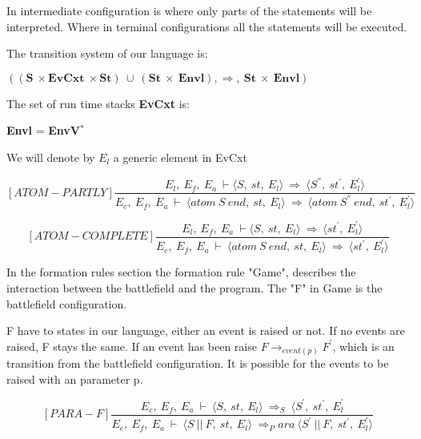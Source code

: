    	In intermediate configuration is where only parts of the statements will be interpreted. Where in terminal configurations  all the statements will be executed.
   	
   	The transition system of our language is:
   	 
   	\begin{math}
   		((\boldsymbol{S} \ \times \boldsymbol{EvCxt} \ \times \boldsymbol{St}) \ \cup \ (\boldsymbol{St} \ \times \ \boldsymbol{Envl}), \Rightarrow, \ \boldsymbol{St} \ \times \ \boldsymbol{Envl})
   	\end{math}
   	
   	The set of run time stacks \textbf{EvCxt} is:
   	
   	\textbf{Envl} = \textbf{EnvV}\begin{math}
   	^*
   	\end{math}
   	
   	We will denote by \begin{math} E_l \end{math} a generic element in EvCxt
   	
   	\[
   	[ATOM-PARTLY]
   	\dfrac{E_l, \ E_f, \ E_a \ \vdash \langle S, \ st, \ E_l \rangle \ \Rightarrow \ \langle S^{''}, \ st^{'}, \ E_l^{'} \rangle}{E_e, \ E_f, \ E_a \ \vdash \ \langle atom \ S \ end, \ st, \ E_l \rangle \ \Rightarrow \ \langle atom \ S^{''} \ end, \ st^{'}, \ E_l^{'} \rangle}
   	\]
   	
   	\[
   	[ATOM-COMPLETE]
   	\dfrac{E_l, \ E_f, \ E_a \ \vdash \langle S, \ st, \ E_l \rangle \ \Rightarrow \ \langle st^{'}, \ E_l^{'} \rangle}{E_e, \ E_f, \ E_a \ \vdash \ \langle atom \ S \ end, \ st, \ E_l \rangle \ \Rightarrow \ \langle st^{'}, \ E_l^{'} \rangle}
   	\]
   	
   	In the formation rules section the formation rule "Game", describes the interaction between the battlefield and the program. The "F" in Game is the battlefield configuration. 
   	
   	F have to states in our language, either an event is raised or not. If no events are raised, F stays the same. If an event has been raise \begin{math} F \rightarrow_{event(p)} F^{'} \end{math}, which is an transition from the battlefield configuration. It is possible for the events to be raised with an parameter p. 
   	
   	\[
   	[PARA-F]
   	\dfrac{E_e, \ E_f, \ E_a \ \vdash \ \langle S, \ st, \ E_l \rangle \ \Rightarrow_S \ \langle S^{'}, \ st^{'}, \ E_l^{'}}{E_e, \ E_f, \ E_a \ \vdash \ \langle S \ || \ F, \ st, \ E_l \rangle \ \Rightarrow_Para \ \langle S^{'} \ || \ F, \ st^{'}, \ E_l^{'} \rangle}
   	\]
   	
